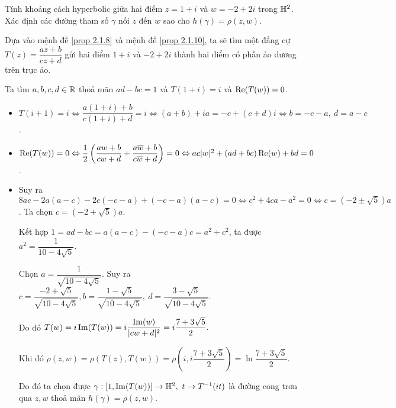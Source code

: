 \begin{exam*}
    Tính khoảng cách hyperbolic giữa hai điểm $z=1+i$ và $w=-2+2i$ trong $\mathbb{H}^2$. Xác định các đường tham số $\gamma$ nối $z$ đến $w$ sao cho $h(\gamma) =\rho(z,w)$.

    Dựa vào mệnh đề \ref{prop 2.1.8} và mệnh đề \ref{prop 2.1.10}, ta sẽ tìm một đẳng cự $T(z) = \dfrac{az+b}{cz+d}$ gửi hai điểm $1+i$ và $-2+2i$ thành hai điểm có phần ảo dương trên trục ảo.

    Ta tìm $a,b,c,d \in \mathbb{R}$ thoả mãn $ad-bc = 1$ và $T(1+i) = i$ và $\operatorname{Re}(T(w)) = 0$. 
    \begin{itemize}
        \item  $T(i+1) = i \Leftrightarrow \dfrac{a(1+i)+b}{c(1+i)+d}=i \Leftrightarrow (a+b)+ia = -c +(c+d)i \Leftrightarrow b = -c-a,~d = a -c$.

        \item $\operatorname{Re}(T(w)) = 0 \Leftrightarrow \dfrac{1}{2}\left(\dfrac{aw+b}{cw+d}+\dfrac{a\overline{w}+b}{c\overline{w}+d}\right) = 0 \Leftrightarrow ac|w|^2+(ad+bc)\operatorname{Re}(w)+bd = 0$.
        \item Suy ra $8ac -2a(a-c)-2c(-c-a) +(-c-a)(a-c) = 0 \Leftrightarrow c^2+4ca-a^2 = 0 \Leftrightarrow c = (-2\pm \sqrt{5})a$. Ta chọn $c = (-2+ \sqrt{5})a$. 

        Kết hợp $1 = ad-bc = a(a-c)-(-c-a)c = a^2+c^2$, ta được $a^2=\dfrac{1}{10-4\sqrt{5}}$. 
        
        Chọn $a = \dfrac{1}{\sqrt{10-4\sqrt{5}}}$. Suy ra $c = \dfrac{-2+\sqrt{5}}{\sqrt{10-4\sqrt{5}}}, b = \dfrac{1-\sqrt{5}}{\sqrt{10-4\sqrt{5}}},~d = \dfrac{3-\sqrt{5}}{\sqrt{10-4\sqrt{5}}}.$

        Do đó $T(w) = i\operatorname{Im}(T(w)) = i \dfrac{\operatorname{Im}(w)}{|cw+d|^2} = i\dfrac{7+3\sqrt{5}}{2}.$

        Khi đó $\rho(z,w) = \rho(T(z),T(w)) = \rho\left(i,i\dfrac{7+3\sqrt{5}}{2}\right) = \ln{\dfrac{7+3\sqrt{5}}{2}}.$

        Do đó ta chọn được $\gamma: [1, \operatorname{Im}(T(w))] \to \mathbb{H}^2, ~t \to T^{-1}(it)$ là đường cong trơn qua $z,w$ thoả mãn $h(\gamma) = \rho(z,w)$.
    \end{itemize}
    
\end{exam*}